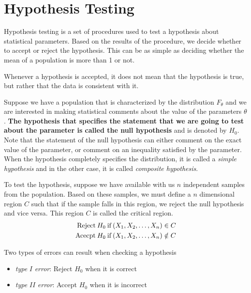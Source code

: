 \documentclass[../probability-notes.tex]{subfiles}
\begin{document}
    \chapter{Hypothesis Testing}
    Hypothesis testing is a set of procedures used to test a hypothesis about statistical parameters. Based on the results of the procedure, we decide whether to accept or reject the hypothesis. This can be as simple as deciding whether the mean of a population is more than 1 or not.\newline

    Whenever a hypothesis is accepted, it does not mean that the hypothesis is true, but rather that the data is consistent with it.\newline

    Suppose we have a population that is characterized by the distribution $F_{\theta}$ and we are interested in making statistical comments about the value of the parameters $\theta$. \textbf{The hypothesis that specifies the statement that we are going to test about the parameter is called the null hypothesis} and is denoted by $H_{0}$. Note that the statement of the null hypothesis can either comment on the exact value of the parameter, or comment on an inequality satisfied by the parameter. When the hypothesis completely specifies the distribution, it is called a \emph{simple hypothesis} and in the other case, it is called \emph{composite hypothesis}.\newline

    To test the hypothesis, suppose we have available with us $n$ independent samples from the population. Based on these samples, we must define a $n$ dimensional region $C$ such that if the sample falls in this region, we reject the null hypothesis and vice versa. This region $C$ is called the critical region.
    \begin{align*}
        \text{Reject\:} H_{0} \text{\:if\:} (X_{1}, X_{2}, \ldots, X_{n}) \in C\\
        \text{Acecpt\:} H_{0} \text{\:if\:} (X_{1}, X_{2}, \ldots, X_{n}) \notin C
    \end{align*}

    Two types of errors can result when checking a hypothesis
    \begin{itemize}
        \item \emph{type} $I$ \emph{error}: Reject $H_{0}$ when it is correct
        \item \emph{type} $II$ \emph{error}: Accept $H_{0}$ when it is incorrect
    \end{itemize}
\end{document}
